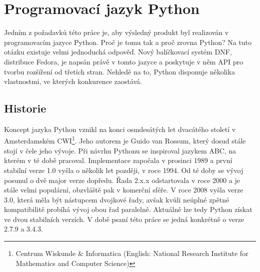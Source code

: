 \documentclass[
  field=inf,
  biblatex,
  glossaries,
  index
]{kidiplom}
\begin{document}
\newpage
\section{Programovací jazyk Python}
Jedním z požadavků této práce je, aby výsledný produkt byl realizován v programovacím jazyce Python. Proč je tomu tak a proč zrovna Python? Na tuto otázku existuje velmi jednoduchá odpověď. Nový balíčkovací systém DNF, distribuce Fedora, je napsán právě v tomto jazyce a poskytuje v něm API pro tvorbu rozšíření od třetích stran. Nehledě na to, Python disponuje několika vlastnostmi, ve kterých konkurence zaostává.

	\subsection{Historie}
	Koncept jazyka Python vznikl na konci osmdesátých let dvacátého století v Amsterdamském CWI\footnote{Centrum Wiskunde \& Informatica (English: National Research Institute for Mathematics and Computer Science)}. Jeho autorem je Guido van Rossum, který dosud stále stojí v čele jeho vývoje. Při návrhu Pythonu se inspiroval jazykem ABC, na kterém v té době pracoval. Implementace započala v prosinci 1989 a první stabilní verze 1.0 vyšla o několik let později, v roce 1994. Od té doby se vývoj posunul o dvě major verze dopředu. Řada 2.x.x odstartovala v roce 2000 a je stále velmi populární, obzvláště pak v komerční sféře.  V roce 2008 vyšla verze 3.0, která měla být nástupcem dvojkové řady, avšak kvůli neúplné zpětné kompatibilitě probíhá vývoj obou řad paralelně. Aktuálně lze tedy Python získat ve dvou stabilních verzích. V době psaní této práce se jedná konkrétně o verze 2.7.9 a 3.4.3.
\end{document}
